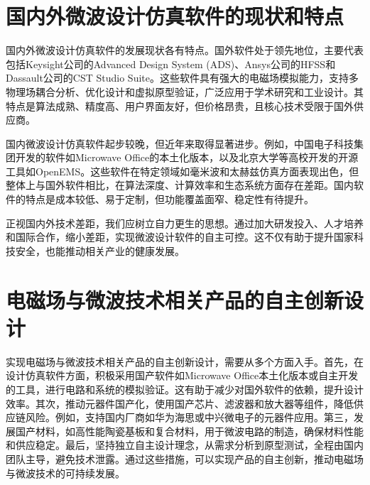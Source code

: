 \documentclass[12pt,hyperref,a4paper,UTF8]{ctexart}
\begin{document}
\section{国内外微波设计仿真软件的现状和特点}

国内外微波设计仿真软件的发展现状各有特点。国外软件处于领先地位，主要代表包括Keysight公司的Advanced Design System (ADS)、Ansys公司的HFSS和Dassault公司的CST Studio Suite。这些软件具有强大的电磁场模拟能力，支持多物理场耦合分析、优化设计和虚拟原型验证，广泛应用于学术研究和工业设计。其特点是算法成熟、精度高、用户界面友好，但价格昂贵，且核心技术受限于国外供应商。

国内微波设计仿真软件起步较晚，但近年来取得显著进步。例如，中国电子科技集团开发的软件如Microwave Office的本土化版本，以及北京大学等高校开发的开源工具如OpenEMS。这些软件在特定领域如毫米波和太赫兹仿真方面表现出色，但整体上与国外软件相比，在算法深度、计算效率和生态系统方面存在差距。国内软件的特点是成本较低、易于定制，但功能覆盖面窄、稳定性有待提升。

正视国内外技术差距，我们应树立自力更生的思想。通过加大研发投入、人才培养和国际合作，缩小差距，实现微波设计软件的自主可控。这不仅有助于提升国家科技安全，也能推动相关产业的健康发展。

\section{电磁场与微波技术相关产品的自主创新设计}

实现电磁场与微波技术相关产品的自主创新设计，需要从多个方面入手。首先，在设计仿真软件方面，积极采用国产软件如Microwave Office本土化版本或自主开发的工具，进行电路和系统的模拟验证。这有助于减少对国外软件的依赖，提升设计效率。其次，推动元器件国产化，使用国产芯片、滤波器和放大器等组件，降低供应链风险。例如，支持国内厂商如华为海思或中兴微电子的元器件应用。第三，发展国产材料，如高性能陶瓷基板和复合材料，用于微波电路的制造，确保材料性能和供应稳定。最后，坚持独立自主设计理念，从需求分析到原型测试，全程由国内团队主导，避免技术泄露。通过这些措施，可以实现产品的自主创新，推动电磁场与微波技术的可持续发展。
\end{document}
